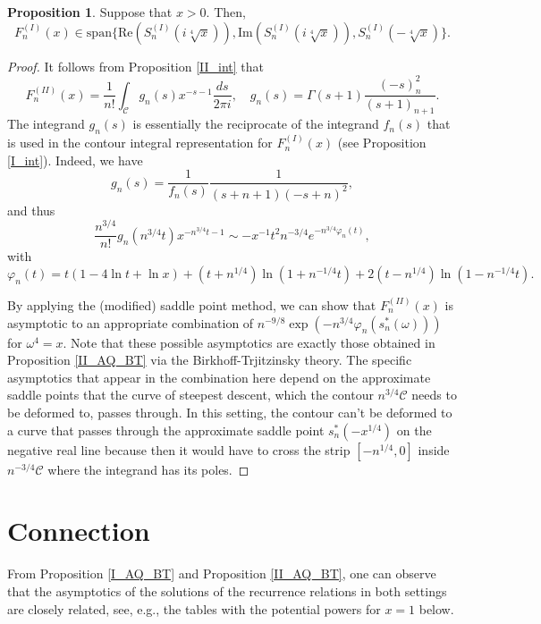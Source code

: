 \documentclass[a4paper,12pt,oneside]{article}
\theoremstyle{definition}
\newtheorem{prop}[defi]{Proposition}
\newcommand{\p}{\varphi}
\begin{document}
\begin{prop}
Suppose that $x>0$. Then,
    $$F_{n}^{(I)}(x) \in\text{span}\{\text{Re}(S_{n}^{(I)}(i\sqrt[4]{x})),\text{Im}(S_{n}^{(I)}(i\sqrt[4]{x})),S_n^{(I)}(-\sqrt[4]{x})\}.$$     
\end{prop}
\begin{proof}
It follows from Proposition \ref{II_int} that
$$F_n^{(II)}(x) = \frac{1}{n!} \int_{\mathcal{C}} g_n(s) x^{-s-1} \frac{ds}{2\pi i},\quad g_n(s) = \Gamma(s+1) \frac{(-s)_n^2}{(s+1)_{n+1}}.$$
The integrand $g_n(s)$ is essentially the reciprocate of the integrand $f_n(s)$ that is used in the contour integral representation for $F_{n}^{(I)}(x)$ (see Proposition \ref{I_int}). Indeed, we have
    $$g_n(s) =  \frac{1}{f_n(s)} \frac{1}{(s+n+1)(-s+n)^2} , $$
and thus
    $$  \frac{n^{3/4}}{n!} g_n(n^{3/4}t) x^{-n^{3/4}t-1} \sim - x^{-1} t^2 n^{-3/4} e^{-n^{3/4}\p_n(t)},  $$
with
    $$\p_n(t) = t(1-4\ln t+\ln x) + (t+n^{1/4})\ln(1+n^{-1/4}t) + 2 (t-n^{1/4}) \ln(1-n^{-1/4}t).$$  

By applying the (modified) saddle point method, we can show that $F_n^{(II)}(x)$ is asymptotic to an appropriate combination of $n^{-9/8}\exp\left(-n^{3/4}\p_n(s^\ast_n(\omega))\right)$ for $\omega^4=x$. Note that these possible asymptotics are exactly those obtained in Proposition \ref{II_AQ_BT} via the Birkhoff-Trjitzinsky theory. The specific asymptotics that appear in the combination here depend on the approximate saddle points that the curve of steepest descent, which the contour $n^{3/4}\mathcal{C}$ needs to be deformed to, passes through. In this setting, the contour can't be deformed to a curve that passes through the approximate saddle point $s_n^\ast(-x^{1/4})$ on the negative real line because then it would have to cross the strip $[-n^{1/4},0]$ inside $n^{-3/4}\mathcal{C}$ where the integrand has its poles.
\end{proof}


\section{Connection}

From Proposition \ref{I_AQ_BT} and Proposition \ref{II_AQ_BT}, one can observe that the asymptotics of the solutions of the recurrence relations in both settings are closely related, see, e.g., the tables with the potential powers for $x=1$ below. 
\end{document}
